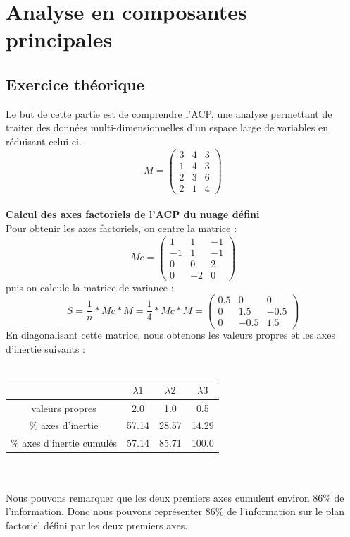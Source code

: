 \documentclass[a4paper, 8pt]{article}
\begin{document}
\newpage
\section{Analyse en composantes principales}
\subsection{Exercice th\'eorique}
Le but de cette partie est de comprendre l'ACP, une analyse permettant de traiter des donn\'ees multi-dimensionnelles d'un espace
large de variables en r\'eduisant celui-ci.
\[M =
\begin{pmatrix}
3 & 4 & 3\\
1 & 4 & 3\\
2 & 3 & 6\\
2 & 1 & 4
\end{pmatrix}\]\\
\textbf{Calcul des axes factoriels de l'ACP du nuage d\'efini}\\
Pour obtenir les axes factoriels, on centre la matrice :
\[Mc =
\begin{pmatrix}
1 & 1 & -1\\
-1 & 1 & -1\\
0 & 0 & 2\\
0 & -2 & 0
\end{pmatrix}\]
puis on calcule la matrice de variance :
\[S = \frac{1}{n}*Mc*M = \frac{1}{4}*Mc*M =
\begin{pmatrix}
0.5 & 0 & 0\\
0 & 1.5 & -0.5\\
0 & -0.5 & 1.5
\end{pmatrix}\]
En diagonalisant cette matrice, nous obtenons les valeurs propres et les axes d'inertie suivants :\\ \\
\begin{tabular}{|c|c|c|c|}
\hline
 & $\lambda1$ & $\lambda2$ & $\lambda3$\\
\hline
valeurs propres & 2.0 & 1.0 & 0.5\\
\hline
\% axes d'inertie & 57.14 & 28.57 & 14.29\\
\hline
\% axes d'inertie cumul\'es & 57.14 & 85.71 & 100.0\\
\hline
\end{tabular}\\ \\
Nous pouvons remarquer que les deux premiers axes cumulent environ 86\% de l'information.
Donc nous pouvons repr\'esenter 86\% de l'information sur le plan factoriel d\'efini par les deux premiers axes.\\
\end{document}
